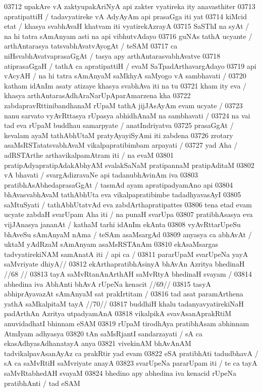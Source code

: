 03712 upakAre vA zaktyupakAriNyA api zakter vyatireka ity anavasthiter  
03713 apratipattiH / tadavyatireke vA AdyAyAm api prasaGga iti yat
03714 kiMcid etat / khasya svabhAvaH khatvam iti vyatirekAzrayA
03715 SaSThI na syAt / na hi tatra sAmAnyam asti na api vibhutvAdayo  
03716 guNAs tathA ucyante / arthAntarasya tatsvabhAvatvAyogAt / teSAM 
03717 ca niHsvabhAvatvaprasaGgAt / tasya apy arthAntarasvabhAvatve 
03718 atiprasaGgaH / tathA ca apratipattiH / evaM SaTpadArthavargAdayo
03719 api vAcyAH / na hi tatra sAmAnyaM saMkhyA saMyogo vA sambhavati /
03720 katham idAnIm asaty atizaye khasya svabhAva iti na tu
03721 kham ity eva / khasya arthAntarasAdhAraNarUpAparAmarzena kha
03722 zabdapravRttinibandhanaM rUpaM tathA jijJAsAyAm evam ucyate /
03723 nanu sarvato vyAvRttasya rUpasya abhidhAnaM na sambhavati /
03724 na vai tad eva rUpaM buddhau samarpyate / anatIndriyatva
03725 prasaGgAt / kevalam ayaM tathAbhUtaM pratyAyayiSyAmi iti zabdena  
03726 zrotary asaMsRSTatatsvabhAvaM vikalpapratibimbam arpayati /  
03727 yad Aha / adRSTArthe arthavikalpamAtram iti / na evaM
03801 pratipAdyapratipAdakAbhyAM svalakSaNaM pratipannaM pratipAditaM  
03802 vA bhavati / svargAdizravaNe api tadanubhAvinAm iva
03803 pratibhAsAbhedaprasaGgAt / tasmAd ayam apratipadyamAno api
03804 bhAvasvabhAvaM tathAbhUta eva vikalpapratibimbe tadadhyavasAyI
03805 saMtuSyati / tathAbhUtatvAd eva zabdArthapratipattes 
03806 tena etad evam ucyate zabdaH svarUpam Aha iti / na punaH  svarUpa  
03807 pratibhAsasya eva vijJAnasya jananAt / kathaM tarhi idAnIm ekAnta  
03808 vyAvRttarUpeSu bhAveSu sAmAnyaM nAma / teSAm asaMsargAd 
03809 anyasya ca abhAvAt / uktaM yAdRzaM sAmAnyam asaMsRSTAnAm  
03810 ekAsaMsargas tadvyatirekiNAM samAnatA iti / api ca / 
03811 	pararUpaM svarUpeNa yayA saMvriyate dhiyA// 
03812 	ekArthapratibhAsinyA bhAvAn Azritya bhedinaH //68 // 
03813 	tayA saMvRtanAnArthAH saMvRtyA bhedinaH svayam / 
03814 	abhedina iva AbhAnti bhAvA rUpeNa kenacit //69// 
03815 	tasyA abhiprAyavazAt sAmAnyaM sat prakIrtitam /
03816 	tad asat paramArthena yathA saMkalpitaM tayA //70//
03817 buddhiH khalu tadanyavyatirekiNaH padArthAn Azritya utpadyamAnA 
03818 vikalpikA svavAsanAprakRtiM anuvidadhatI bhinnam eSAM  
03819 rUpaM tirodhAya pratibhAsam abhinnam AtmIyam adhyasya 
03820 tAn saMsRjantI sandarzayati / sA ca ekasAdhyasAdhanatayA anya  
03821 vivekinAM bhAvAnAM tadvikalpavAsanAyAz ca prakRtir yad evam
03822 eSA pratibhAti tadudbhavA / sA ca saMvRtiH saMvriyate anayA
03823 svarUpeNa pararUpam iti / te ca tayA saMvRtabhedAH svayaM
03824 bhedino apy abhedina iva kenacid rUpeNa pratibhAnti / tad eSAM
